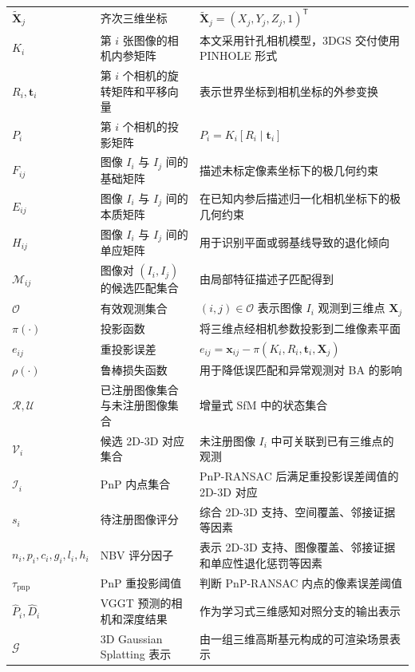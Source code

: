 \documentclass[lang=cn,a4paper,newtx]{elegantpaper} %
\begin{document}
\begin{longtable}{>{\centering\arraybackslash}p{}p{}p{}}
$\tilde{\mathbf{X}}_j$ & 齐次三维坐标 & $\tilde{\mathbf{X}}_j=(X_j,Y_j,Z_j,1)^\mathsf{T}$ \\
$K_i$ & 第 $i$ 张图像的相机内参矩阵 & 本文采用针孔相机模型，3DGS 交付使用 PINHOLE 形式 \\
$R_i,\mathbf{t}_i$ & 第 $i$ 个相机的旋转矩阵和平移向量 & 表示世界坐标到相机坐标的外参变换 \\
$P_i$ & 第 $i$ 个相机的投影矩阵 & $P_i=K_i[R_i\mid\mathbf{t}_i]$ \\
$F_{ij}$ & 图像 $I_i$ 与 $I_j$ 间的基础矩阵 & 描述未标定像素坐标下的极几何约束 \\
$E_{ij}$ & 图像 $I_i$ 与 $I_j$ 间的本质矩阵 & 在已知内参后描述归一化相机坐标下的极几何约束 \\
$H_{ij}$ & 图像 $I_i$ 与 $I_j$ 间的单应矩阵 & 用于识别平面或弱基线导致的退化倾向 \\
$\mathcal{M}_{ij}$ & 图像对 $(I_i,I_j)$ 的候选匹配集合 & 由局部特征描述子匹配得到 \\
$\mathcal{O}$ & 有效观测集合 & $(i,j)\in\mathcal{O}$ 表示图像 $I_i$ 观测到三维点 $\mathbf{X}_j$ \\
$\pi(\cdot)$ & 投影函数 & 将三维点经相机参数投影到二维像素平面 \\
$e_{ij}$ & 重投影误差 & $e_{ij}=\mathbf{x}_{ij}-\pi(K_i,R_i,\mathbf{t}_i,\mathbf{X}_j)$ \\
$\rho(\cdot)$ & 鲁棒损失函数 & 用于降低误匹配和异常观测对 BA 的影响 \\
$\mathcal{R},\mathcal{U}$ & 已注册图像集合与未注册图像集合 & 增量式 SfM 中的状态集合 \\
$\mathcal{V}_i$ & 候选 2D-3D 对应集合 & 未注册图像 $I_i$ 中可关联到已有三维点的观测 \\
$\mathcal{I}_i$ & PnP 内点集合 & PnP-RANSAC 后满足重投影误差阈值的 2D-3D 对应 \\
$s_i$ & 待注册图像评分 & 综合 2D-3D 支持、空间覆盖、邻接证据等因素 \\
$n_i,p_i,c_i,g_i,l_i,h_i$ & NBV 评分因子 & 表示 2D-3D 支持、图像覆盖、邻接证据和单应性退化惩罚等因素 \\
$\tau_{\mathrm{pnp}}$ & PnP 重投影阈值 & 判断 PnP-RANSAC 内点的像素误差阈值 \\
$\hat{P}_i,\hat{D}_i$ & VGGT 预测的相机和深度结果 & 作为学习式三维感知对照分支的输出表示 \\
$\mathcal{G}$ & 3D Gaussian Splatting 表示 & 由一组三维高斯基元构成的可渲染场景表示 \\
\bottomrule
\end{longtable}
\end{document}
